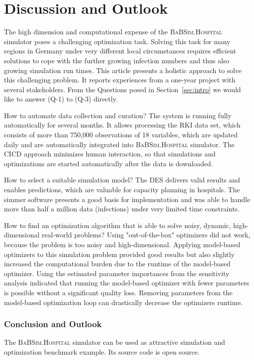 \documentclass[conference]{IEEEtran}
\newcommand{\babsimhospital}{\textsc{BaBSim.Hospital}\xspace}
\begin{document}
\section{Discussion and Outlook}\label{sec:discussion}
The high dimension and computational expense of the \babsimhospital simulator 
poses a challenging optimization task. 
Solving this task for many regions in Germany under very different local circumstances requires 
efficient solutions to cope with the further growing infection numbers and thus also growing simulation run times. 
This article presents a holistic approach to solve this challenging problem. 
It reports experiences from a one-year project with several stakeholders. 
From the Questions posed in Section~\ref{sec:intro} we would like to answer (Q-1) to (Q-3) directly.
\begin{compactenum}[(Q-1)]
\item How to automate data collection and curation?
The system is running fully automatically for several months.
It allows processing  the \gls{RKI} data set, which consists of more than 
750,000 observations of 18 variables, which are updated daily and are automatically integrated into \babsimhospital simulator. 
The \gls{CICD} approach minimizes human interaction, so that simulations and optimizations are
started automatically after the data is downloaded.
\item How to select a suitable simulation model?
The \gls{DES} delivers valid results and enables predictions, which are valuable for capacity planning in hospitals.
The \gls{simmer} software presents a good basis for implementation and was able to handle more than half a million data (infections) under very limited time constraints. 
\item How to find an optimization algorithm that is able to solve noisy, dynamic, high-dimensional real-world problems?
Using "out-of-the-box" optimizers did not work, because the problem is too noisy and high-dimensional.
Applying model-based optimizers to this simulation problem provided good results but also slightly increased the computational burden due to the runtime of the model-based optimizer. 
Using the estimated parameter importances from the sensitivity analysis indicated that running the model-based optimizer with fewer parameters is possible without a significant quality loss. 
Removing parameters from the model-based optimization loop can drastically decrease the optimizers runtime. 
\end{compactenum}
\subsubsection*{Conclusion and Outlook}
The \babsimhospital simulator can be used as attractive simulation and optimization benchmark example. Its source code is open source. 





\end{document}
